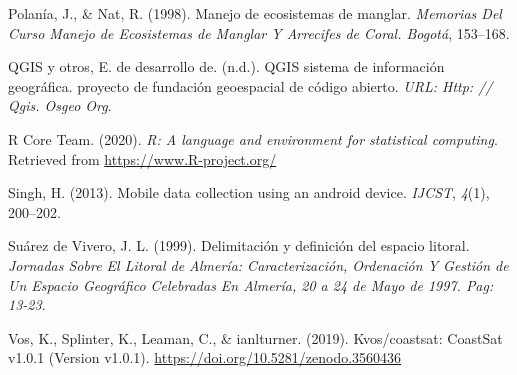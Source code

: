 \documentclass[11pt,]{article}
\begin{document}
\hypertarget{ref-polania1998manejo}{}
Polanía, J., \& Nat, R. (1998). Manejo de ecosistemas de manglar.
\emph{Memorias Del Curso Manejo de Ecosistemas de Manglar Y Arrecifes de
Coral. Bogotá}, 153--168.

\hypertarget{ref-qgis2015qgis}{}
QGIS y otros, E. de desarrollo de. (n.d.). QGIS sistema de información
geográfica. proyecto de fundación geoespacial de código abierto.
\emph{URL: Http: // Qgis. Osgeo Org}.

\hypertarget{ref-r2020r}{}
R Core Team. (2020). \emph{R: A language and environment for statistical
computing}. Retrieved from \href{\%0Ahttps://www.R-project.org/\%0A}{
https://www.R-project.org/
}

\hypertarget{ref-singh2013mobile}{}
Singh, H. (2013). Mobile data collection using an android device.
\emph{IJCST}, \emph{4}(1), 200--202.

\hypertarget{ref-suarez1999delimitacion}{}
Suárez de Vivero, J. L. (1999). Delimitación y definición del espacio
litoral. \emph{Jornadas Sobre El Litoral de Almería: Caracterización,
Ordenación Y Gestión de Un Espacio Geográfico Celebradas En Almería, 20
a 24 de Mayo de 1997. Pag: 13-23}.

\hypertarget{ref-kilian_vos_2019_3560436}{}
Vos, K., Splinter, K., Leaman, C., \& ianlturner. (2019). Kvos/coastsat:
CoastSat v1.0.1 (Version v1.0.1).
\url{https://doi.org/10.5281/zenodo.3560436}




\newpage
\singlespacing 
\end{document}
